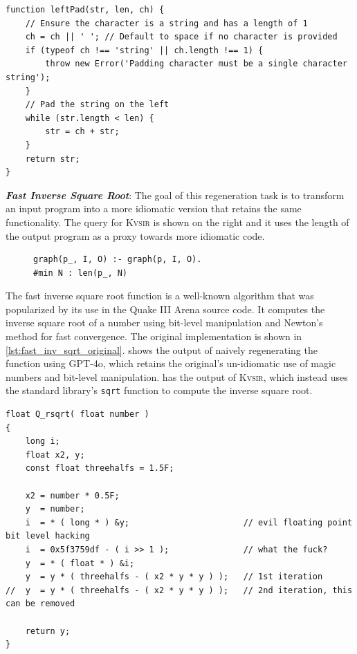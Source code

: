\documentclass[sigplan,review,anonymous,10pt]{acmart}
\def\gptmodel{{GPT-4o}\xspace}
\newcommand{\sys}{{\scshape Kv{\textalpha}sir}\xspace}
\newcommand{\heading}[1]{\vspace{2pt}\noindent\textbf{\emph{#1}}:\enspace}
\newcommand{\ttt}[1]{\texttt{#1}\xspace}
\begin{document}
\begin{listing}[htpb]
  \begin{verbatim}
function leftPad(str, len, ch) {
    // Ensure the character is a string and has a length of 1
    ch = ch || ' '; // Default to space if no character is provided
    if (typeof ch !== 'string' || ch.length !== 1) {
        throw new Error('Padding character must be a single character string');
    }
    // Pad the string on the left
    while (str.length < len) {
        str = ch + str;
    }
    return str;
}
  \end{verbatim}
  \caption{The output of \sys, having regenerated \ttt{leftPad}.}
\end{listing}

\heading{Fast Inverse Square Root}
The goal of this regeneration task is to transform an input 
program into a more idiomatic version that retains the same functionality.
The query for \sys is shown on the right and it uses the length of the output program as a proxy towards 
more idiomatic code.
\begin{figure}
\begin{verbatim}
graph(p_, I, O) :- graph(p, I, O).
#min N : len(p_, N)
\end{verbatim}
\end{figure}
The fast inverse square root function is a well-known algorithm that was
popularized by its use in the Quake III Arena source code.
It computes the inverse square root of a number using bit-level manipulation and
Newton's method for fast convergence.
The original implementation is shown in \cref{lst:fast_inv_sqrt_original}.
 shows the output of naively regenerating the function using \gptmodel,
which retains the original's un-idiomatic use of magic numbers and bit-level manipulation.
 has the output of \sys, which instead uses the standard library's
\ttt{sqrt} function to compute the inverse square root.

\begin{listing}[htpb]
\begin{verbatim}
float Q_rsqrt( float number )
{
	long i;
	float x2, y;
	const float threehalfs = 1.5F;

	x2 = number * 0.5F;
	y  = number;
	i  = * ( long * ) &y;                       // evil floating point bit level hacking
	i  = 0x5f3759df - ( i >> 1 );               // what the fuck?
	y  = * ( float * ) &i;
	y  = y * ( threehalfs - ( x2 * y * y ) );   // 1st iteration
//	y  = y * ( threehalfs - ( x2 * y * y ) );   // 2nd iteration, this can be removed

	return y;
}
\end{verbatim}
  \caption{The original implementation of the fast inverse square root function 
  found in the Quake III source code~\cite{fast_inv_sqrt}}
  \label{lst:fast_inv_sqrt_original}
\end{listing}
\end{document}
